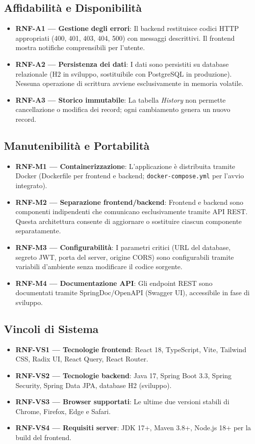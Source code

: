﻿\documentclass[a4paper,11pt]{article}
\begin{document}
\subsection{Affidabilit\`a e Disponibilit\`a}
\begin{itemize}
  \item \textbf{RNF-A1 --- Gestione degli errori}: Il backend restituisce codici HTTP appropriati (400, 401, 403, 404, 500) con messaggi descrittivi. Il frontend mostra notifiche comprensibili per l'utente.
  \item \textbf{RNF-A2 --- Persistenza dei dati}: I dati sono persistiti su database relazionale (H2 in sviluppo, sostituibile con PostgreSQL in produzione). Nessuna operazione di scrittura avviene esclusivamente in memoria volatile.
  \item \textbf{RNF-A3 --- Storico immutabile}: La tabella \emph{History} non permette cancellazione o modifica dei record; ogni cambiamento genera un nuovo record.
\end{itemize}

\subsection{Manutenibilit\`a e Portabilit\`a}
\begin{itemize}
  \item \textbf{RNF-M1 --- Containerizzazione}: L'applicazione \`e distribuita tramite Docker (Dockerfile per frontend e backend; \texttt{docker-compose.yml} per l'avvio integrato).
  \item \textbf{RNF-M2 --- Separazione frontend/backend}: Frontend e backend sono componenti indipendenti che comunicano esclusivamente tramite API REST. Questa architettura consente di aggiornare o sostituire ciascun componente separatamente.
  \item \textbf{RNF-M3 --- Configurabilit\`a}: I parametri critici (URL del database, segreto JWT, porta del server, origine CORS) sono configurabili tramite variabili d'ambiente senza modificare il codice sorgente.
  \item \textbf{RNF-M4 --- Documentazione API}: Gli endpoint REST sono documentati tramite SpringDoc/OpenAPI (Swagger UI), accessibile in fase di sviluppo.
\end{itemize}

\subsection{Vincoli di Sistema}
\begin{itemize}
  \item \textbf{RNF-VS1 --- Tecnologie frontend}: React 18, TypeScript, Vite, Tailwind CSS, Radix UI, React Query, React Router.
  \item \textbf{RNF-VS2 --- Tecnologie backend}: Java 17, Spring Boot 3.3, Spring Security, Spring Data JPA, database H2 (sviluppo).
  \item \textbf{RNF-VS3 --- Browser supportati}: Le ultime due versioni stabili di Chrome, Firefox, Edge e Safari.
  \item \textbf{RNF-VS4 --- Requisiti server}: JDK 17+, Maven 3.8+, Node.js 18+ per la build del frontend.
\end{itemize}
\end{document}
